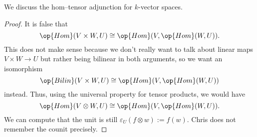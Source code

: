 \documentclass[../notes.tex]{subfiles}
\begin{document}
\begin{exe}
	We discuss the hom--tensor adjunction for $k$-vector spaces.
\end{exe}
\begin{proof}
	It is false that
	\[\op{Hom}(V\times W,U)\cong\op{Hom}(V,\op{Hom}(W,U)).\]
	This does not make sense because we don't really want to talk about linear maps $V\times W\to U$ but rather being bilinear in both arguments, so we want an isomorphism
	\[\op{Bilin}(V\times W,U)\cong\op{Hom}(V,\op{Hom}(W,U))\]
	instead. Thus, using the universal property for tensor products, we would have
	\[\op{Hom}(V\otimes W,U)\cong\op{Hom}(V,\op{Hom}(W,U)).\]
	We can compute that the unit is still $\varepsilon_U(f\otimes w):=f(w)$. Chris does not remember the counit precisely.
\end{proof}
\end{document}
